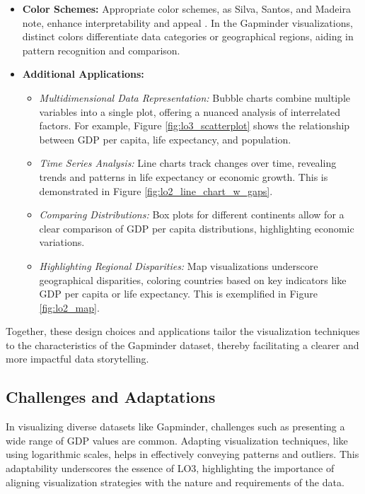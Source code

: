 \begin{itemize}
    \item \textbf{Color Schemes:} Appropriate color schemes, as Silva, Santos, and Madeira note, enhance interpretability and appeal \cite{silvaUsingColorVisualization2011}. In the Gapminder visualizations, distinct colors differentiate data categories or geographical regions, aiding in pattern recognition and comparison.
    
    \item \textbf{Additional Applications:}
    \begin{itemize}
        \item \textit{Multidimensional Data Representation:} Bubble charts combine multiple variables into a single plot, offering a nuanced analysis of interrelated factors. For example, Figure \ref{fig:lo3_scatterplot} shows the relationship between GDP per capita, life expectancy, and population.
        \item \textit{Time Series Analysis:} Line charts track changes over time, revealing trends and patterns in life expectancy or economic growth. This is demonstrated in Figure \ref{fig:lo2_line_chart_w_gaps}.
        \item \textit{Comparing Distributions:} Box plots for different continents allow for a clear comparison of GDP per capita distributions, highlighting economic variations.
        \item \textit{Highlighting Regional Disparities:} Map visualizations underscore geographical disparities, coloring countries based on key indicators like GDP per capita or life expectancy. This is exemplified in Figure \ref{fig:lo2_map}.
    \end{itemize}
\end{itemize}

Together, these design choices and applications tailor the visualization techniques to the characteristics of the Gapminder dataset, thereby facilitating a clearer and more impactful data storytelling.

\subsection{Challenges and Adaptations}
In visualizing diverse datasets like Gapminder, challenges such as presenting a wide range of GDP values are common. Adapting visualization techniques, like using logarithmic scales, helps in effectively conveying patterns and outliers. This adaptability underscores the essence of LO3, highlighting the importance of aligning visualization strategies with the nature and requirements of the data.